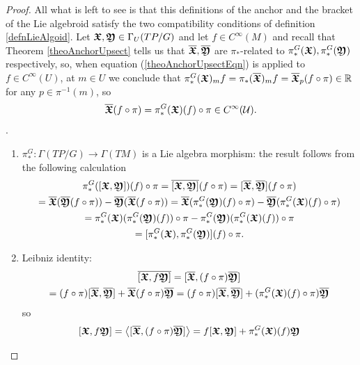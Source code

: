 \begin{proof}
All what is left to see is that this definitions of the anchor and the bracket of the Lie algebroid satisfy the two compatibility conditions of definition \ref{defnLieAlgoid}. Let $\bm{\mathfrak{X}}, \bm{\mathfrak{Y}} \in \Gamma_U(TP/G)$ and let $f \in C^{\infty}(M)$ and recall that Theorem \ref{theoAnchorUpsect} tells us that $\overline{\bm{\bm{\mathfrak{X}}}}, \overline{\bm{\bm{\mathfrak{Y}}}}$ are $\pi_*$-related to $\pi_*^G(\bm{\mathfrak{X}}), \pi_*^G(\bm{\mathfrak{Y}})$ respectively, so, when equation (\ref{theoAnchorUpsectEqn}) is applied to $f \in C^\infty(U)$, at $m\in U$ we conclude that 
    $\pi_*^G(\bm{\mathfrak{X}})_mf = \pi_*(\overline{\bm{\bm{\mathfrak{X}}}})_m f = \overline{\bm{\bm{\mathfrak{X}}}}_p(f \circ \pi) \in \mathbb{R}$ for any $p \in \pi^{-1}(m)$, so 
    \begin{equation}
        \overline{\bm{\bm{\mathfrak{X}}}}(f \circ \pi) = \pi_*^G(\bm{\mathfrak{X}})(f) \circ \pi \in C^\infty(\mathcal U).
    \end{equation}.

    \begin{enumerate}
    
    \item $\pi_*^G: \Gamma(TP/G) \to \Gamma(TM)$ is a Lie algebra morphism: the result follows from the following calculation
    \begin{multline*}
        \pi_*^G([\bm{\mathfrak{X}}, \bm{\mathfrak{Y}}])(f) \circ \pi
        = \overline{[\bm{\mathfrak{X}}, \bm{\mathfrak{Y}}]}(f \circ \pi)
        = [\overline{\bm{\mathfrak{X}}}, \overline{\bm{\mathfrak{Y}}}](f \circ \pi) \\
        = \overline{\bm{\mathfrak{X}}} (\overline{\bm{\mathfrak{Y}}}(f \circ \pi)) - \overline{\bm{\mathfrak{Y}}} (\overline{\bm{\mathfrak{X}}}(f \circ \pi)) 
        = \overline{\bm{\mathfrak{X}}} (\pi_*^G(\bm{\mathfrak{Y}})(f) \circ \pi) - \overline{\bm{\mathfrak{Y}}} (\pi_*^G(\bm{\mathfrak{X}})(f) \circ \pi)\\
        = \pi_*^G(\bm{\mathfrak{X}})(\pi_*^G(\bm{\mathfrak{Y}})(f)) \circ \pi - \pi_*^G(\bm{\mathfrak{Y}})(\pi_*^G(\bm{\mathfrak{X}})(f)) \circ \pi\\
        = [\pi_*^G(\bm{\mathfrak{X}}), \pi_*^G(\bm{\mathfrak{Y}})](f) \circ \pi.
    \end{multline*}
    
    \item Leibniz identity:
    \begin{multline*}
        \overline{[\bm{\mathfrak{X}}, f \bm{\mathfrak{Y}}]} 
        =[\overline{\bm{\bm{\mathfrak{X}}}}, (f \circ \pi) \overline{\bm{\bm{\mathfrak{Y}}}}] \\
        = (f \circ \pi)[\overline{\bm{\bm{\mathfrak{X}}}}, \overline{\bm{\bm{\mathfrak{Y}}}}] + \overline{\bm{\bm{\mathfrak{X}}}}(f \circ \pi) \overline{\bm{\bm{\mathfrak{Y}}}} = 
        (f \circ \pi)[\overline{\bm{\bm{\mathfrak{X}}}}, \overline{\bm{\bm{\mathfrak{Y}}}}] + (\pi_*^G(\bm{\mathfrak{X}})(f) \circ \pi) \overline{\bm{\bm{\mathfrak{Y}}}}
    \end{multline*} so 
    \[
        [\bm{\mathfrak{X}}, f \bm{\mathfrak{Y}}] = \left\langle [\overline{\bm{\bm{\mathfrak{X}}}}, (f \circ \pi) \overline{\bm{\bm{\mathfrak{Y}}}}] \right\rangle = f[\bm{\mathfrak{X}}, \bm{\mathfrak{Y}}] + \pi_*^G(\bm{\mathfrak{X}})(f) \bm{\mathfrak{Y}}
    \]
    
    \end{enumerate}

\end{proof}

